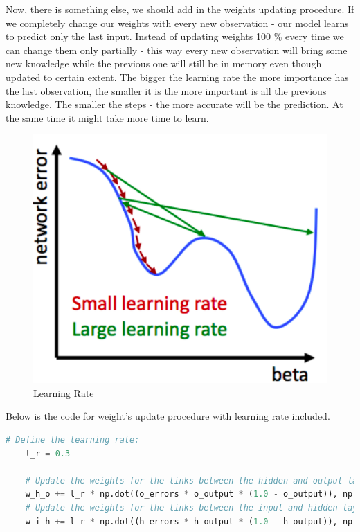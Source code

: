Now, there is something else, we should add in the weights updating procedure. If we completely change our weights with every new observation - our model learns to predict only the last input. Instead of updating weights 100 \% every time we can change them only partially - this way every new observation will bring some new knowledge while the previous one will still be in memory even though updated to certain extent. The bigger the learning rate the more importance has the last observation, the smaller it is the more important is all the previous knowledge. The smaller the steps - the more accurate will be the prediction. At the same time it might take more time to learn.

\begin{figure}[H]
    \includegraphics[width=\linewidth]{pics/learning_rate.png}
    \caption{\label{fig:bp} Learning Rate}
\end{figure}

Below is the code for weight's update procedure with learning rate included.

\begin{lstlisting}[language=Python]
    # Define the learning rate:
    l_r = 0.3

    # Update the weights for the links between the hidden and output layers:
    w_h_o += l_r * np.dot((o_errors * o_output * (1.0 - o_output)), np.transpose(h_output))
    # Update the weights for the links between the input and hidden layers:
    w_i_h += l_r * np.dot((h_errors * h_output * (1.0 - h_output)), np.transpose(input))
\end{lstlisting}

